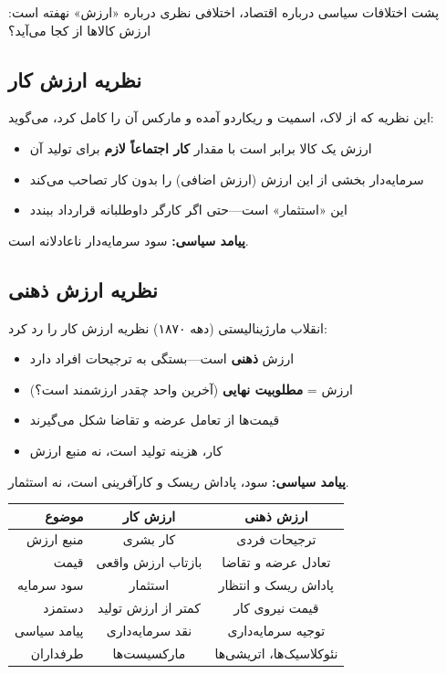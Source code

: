 پشت اختلافات سیاسی درباره اقتصاد، اختلافی نظری درباره «ارزش» نهفته است: ارزش کالاها از کجا می‌آید؟

\subsection{نظریه ارزش کار}

\begin{defbox}
این نظریه که از لاک، اسمیت و ریکاردو آمده و مارکس آن را کامل کرد، می‌گوید:
\begin{itemize}[nosep]
    \item ارزش یک کالا برابر است با مقدار \textbf{کار اجتماعاً لازم} برای تولید آن
    \item سرمایه‌دار بخشی از این ارزش (ارزش اضافی) را بدون کار تصاحب می‌کند
    \item این «استثمار» است—حتی اگر کارگر داوطلبانه قرارداد ببندد
\end{itemize}
\textbf{پیامد سیاسی:} سود سرمایه‌دار ناعادلانه است.
\end{defbox}

\subsection{نظریه ارزش ذهنی}

\begin{defbox}
انقلاب مارژینالیستی (دهه ۱۸۷۰) نظریه ارزش کار را رد کرد:
\begin{itemize}[nosep]
    \item ارزش \textbf{ذهنی} است—بستگی به ترجیحات افراد دارد
    \item ارزش = \textbf{مطلوبیت نهایی} (آخرین واحد چقدر ارزشمند است؟)
    \item قیمت‌ها از تعامل عرضه و تقاضا شکل می‌گیرند
    \item کار، هزینه تولید است، نه منبع ارزش
\end{itemize}
\textbf{پیامد سیاسی:} سود، پاداش ریسک و کارآفرینی است، نه استثمار.
\end{defbox}

\begin{comparebox}
\begin{table}[H]
\centering
\begin{tabular}{r|c|c}
\toprule
\textbf{موضوع} & \textbf{ارزش کار} & \textbf{ارزش ذهنی} \\
\midrule
منبع ارزش & کار بشری & ترجیحات فردی \\
قیمت & بازتاب ارزش واقعی & تعادل عرضه و تقاضا \\
سود سرمایه & استثمار & پاداش ریسک و انتظار \\
دستمزد & کمتر از ارزش تولید & قیمت نیروی کار \\
پیامد سیاسی & نقد سرمایه‌داری & توجیه سرمایه‌داری \\
طرفداران & مارکسیست‌ها & نئوکلاسیک‌ها، اتریشی‌ها \\
\bottomrule
\end{tabular}
\end{table}
\end{comparebox}

